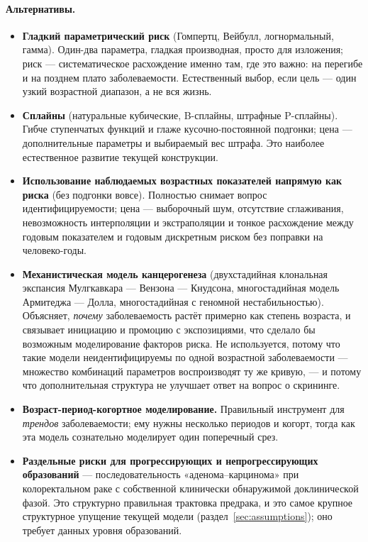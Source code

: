 \documentclass[12pt,a4paper]{article}
\newcommand{\alt}[1]{\paragraph{Альтернативы.} #1}
\begin{document}
\alt{\begin{itemize}[nosep]
  \item \textbf{Гладкий параметрический риск} (Гомпертц, Вейбулл, логнормальный, гамма). Один-два
        параметра, гладкая производная, просто для изложения; риск --- систематическое расхождение именно
        там, где это важно: на перегибе и на позднем плато заболеваемости. Естественный выбор, если цель ---
        один узкий возрастной диапазон, а не вся жизнь.
  \item \textbf{Сплайны} (натуральные кубические, B-сплайны, штрафные P-сплайны). Гибче ступенчатых функций
        и глаже кусочно-постоянной подгонки; цена --- дополнительные параметры и выбираемый вес штрафа. Это
        наиболее естественное развитие текущей конструкции.
  \item \textbf{Использование наблюдаемых возрастных показателей напрямую как риска} (без подгонки вовсе).
        Полностью снимает вопрос идентифицируемости; цена --- выборочный шум, отсутствие сглаживания,
        невозможность интерполяции и экстраполяции и тонкое расхождение между годовым показателем и годовым
        дискретным риском без поправки на человеко-годы.
  \item \textbf{Механистическая модель канцерогенеза} (двухстадийная клональная экспансия
        Мулгкавкара --- Вензона --- Кнудсона, многостадийная модель Армитеджа --- Долла, многостадийная с
        геномной нестабильностью). Объясняет, \emph{почему} заболеваемость растёт примерно как степень
        возраста, и связывает инициацию и промоцию с экспозициями, что сделало бы возможным моделирование
        факторов риска. Не используется, потому что такие модели неидентифицируемы по одной возрастной
        заболеваемости --- множество комбинаций параметров воспроизводят ту же кривую, --- и потому что
        дополнительная структура не улучшает ответ на вопрос о скрининге.
  \item \textbf{Возраст-период-когортное моделирование.} Правильный инструмент для \emph{трендов}
        заболеваемости; ему нужны несколько периодов и когорт, тогда как эта модель сознательно
        моделирует один поперечный срез.
  \item \textbf{Раздельные риски для прогрессирующих и непрогрессирующих образований} ---
        последовательность «аденома--карцинома» при колоректальном раке с собственной клинически
        обнаружимой доклинической фазой. Это структурно правильная трактовка предрака, и это самое крупное
        структурное упущение текущей модели (раздел~\ref{sec:assumptions}); оно требует данных уровня
        образований.
\end{itemize}}
\end{document}
